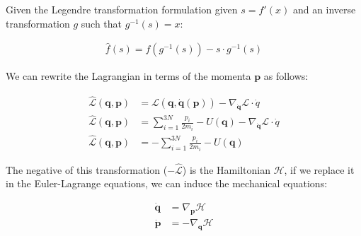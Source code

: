\documentclass[draft]{agujournal2019}
\begin{document}
Given the Legendre transformation formulation given $s = f'(x)$ and an inverse transformation $g$ such that $g^{-1}(s) = x$:

\begin{align}
    \hat{f}(s) = f(g^{-1}(s)) - s \cdot g^{-1}(s)
\end{align}

We can rewrite the Lagrangian in terms of the momenta $\mathbf{p}$ as follows:

\begin{align}
    \hat{\mathcal{L}}(\mathbf{q}, \mathbf{p}) &= \mathcal{L}(\mathbf{q}, \dot{\mathbf{q}}(\mathbf{p})) - \nabla_{\dot{\mathbf{q}}} \mathcal{L} \cdot \dot{q} \\
    \hat{\mathcal{L}}(\mathbf{q}, \mathbf{p}) &= \sum_{i = 1}^{3N} \frac{p_i}{2m_i} - U(\mathbf{q}) - \nabla_{\dot{\mathbf{q}}} \mathcal{L} \cdot \dot{q} \\
    \hat{\mathcal{L}}(\mathbf{q}, \mathbf{p}) &= - \sum_{i = 1}^{3N} \frac{p_i}{2m_i} - U(\mathbf{q})
\end{align}

The negative of this transformation ($-\hat{\mathcal{L}}$) is the Hamiltonian $\mathcal{H}$, if we replace it in the Euler-Lagrange equations, we can induce the mechanical equations:

\begin{align}
    \dot{\mathbf{q}} &= \nabla_\mathbf{p} \mathcal{H} \\
    \dot{\mathbf{p}} &= - \nabla_\mathbf{q} \mathcal{H}
\end{align}
\end{document}
